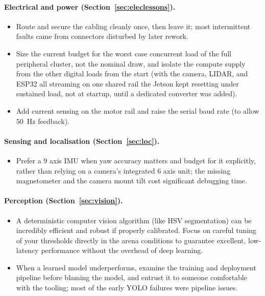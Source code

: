 \documentclass[11pt]{article}
\begin{document}
\paragraph{Electrical and power (Section~\ref{sec:eleclessons}).}
\begin{itemize}[noitemsep]
    \item Route and secure the cabling cleanly once, then leave it; most intermittent faults came from connectors disturbed by later rework.
    \item Size the current budget for the worst case concurrent load of the full peripheral cluster, not the nominal draw, and isolate the compute supply from the other digital loads from the start (with the camera, LIDAR, and ESP32 all streaming on one shared rail the Jetson kept resetting under sustained load, not at startup, until a dedicated converter was added).
    \item Add current sensing on the motor rail and raise the serial baud rate (to allow $50$~Hz feedback).
\end{itemize}

\paragraph{Sensing and localisation (Section~\ref{sec:loc}).}
\begin{itemize}[noitemsep]
    \item Prefer a 9 axis IMU when yaw accuracy matters and budget for it explicitly, rather than relying on a camera's integrated 6 axis unit; the missing magnetometer and the camera mount tilt cost significant debugging time.
\end{itemize}

\paragraph{Perception (Section~\ref{sec:vision}).}
\begin{itemize}[noitemsep]
    \item A deterministic computer vision algorithm (like HSV segmentation) can be incredibly efficient and robust if properly calibrated. Focus on careful tuning of your thresholds directly in the arena conditions to guarantee excellent, low-latency performance without the overhead of deep learning.
    \item When a learned model underperforms, examine the training and deployment pipeline before blaming the model, and entrust it to someone comfortable with the tooling; most of the early YOLO failures were pipeline issues.
\end{itemize}
\end{document}
